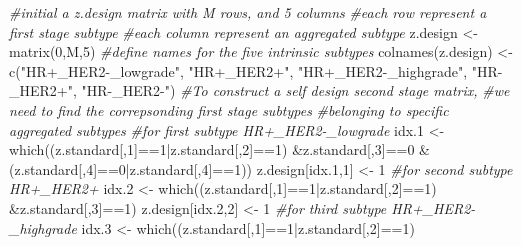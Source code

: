 \documentclass[11pt,]{article}
\newenvironment{Shaded}{\begin{snugshade}}{\end{snugshade}}
\newcommand{\CommentTok}[1]{\textcolor[rgb]{0.56,0.35,0.01}{\textit{#1}}}
\newcommand{\DecValTok}[1]{\textcolor[rgb]{0.00,0.00,0.81}{#1}}
\newcommand{\FloatTok}[1]{\textcolor[rgb]{0.00,0.00,0.81}{#1}}
\newcommand{\FunctionTok}[1]{\textcolor[rgb]{0.00,0.00,0.00}{#1}}
\newcommand{\NormalTok}[1]{#1}
\newcommand{\OtherTok}[1]{\textcolor[rgb]{0.56,0.35,0.01}{#1}}
\newcommand{\SpecialCharTok}[1]{\textcolor[rgb]{0.00,0.00,0.00}{#1}}
\newcommand{\StringTok}[1]{\textcolor[rgb]{0.31,0.60,0.02}{#1}}
\begin{document}
\begin{Shaded}
\begin{Highlighting}[]
\CommentTok{\#initial a z.design matrix with M rows, and 5 columns}
\CommentTok{\#each row represent a first stage subtype}
\CommentTok{\#each column represent an aggregated subtype}
\NormalTok{z.design }\OtherTok{\textless{}{-}} \FunctionTok{matrix}\NormalTok{(}\DecValTok{0}\NormalTok{,M,}\DecValTok{5}\NormalTok{)}
\CommentTok{\#define names for the five intrinsic subtypes}
\FunctionTok{colnames}\NormalTok{(z.design) }\OtherTok{\textless{}{-}} \FunctionTok{c}\NormalTok{(}\StringTok{"HR+\_HER2{-}\_lowgrade"}\NormalTok{,}
                        \StringTok{"HR+\_HER2+"}\NormalTok{,}
                        \StringTok{"HR+\_HER2{-}\_highgrade"}\NormalTok{,}
                        \StringTok{"HR{-}\_HER2+"}\NormalTok{, }
                        \StringTok{"HR{-}\_HER2{-}"}\NormalTok{)}
\CommentTok{\#To construct a self design second stage matrix,}
\CommentTok{\#we need to find the correpsonding first stage subtypes}
\CommentTok{\#belonging to specific aggregated subtypes}
\CommentTok{\#for first subtype HR+\_HER2{-}\_lowgrade}
\NormalTok{idx}\FloatTok{.1} \OtherTok{\textless{}{-}} \FunctionTok{which}\NormalTok{((z.standard[,}\DecValTok{1}\NormalTok{]}\SpecialCharTok{==}\DecValTok{1}\SpecialCharTok{|}\NormalTok{z.standard[,}\DecValTok{2}\NormalTok{]}\SpecialCharTok{==}\DecValTok{1}\NormalTok{)}
               \SpecialCharTok{\&}\NormalTok{z.standard[,}\DecValTok{3}\NormalTok{]}\SpecialCharTok{==}\DecValTok{0}
               \SpecialCharTok{\&}\NormalTok{(z.standard[,}\DecValTok{4}\NormalTok{]}\SpecialCharTok{==}\DecValTok{0}\SpecialCharTok{|}\NormalTok{z.standard[,}\DecValTok{4}\NormalTok{]}\SpecialCharTok{==}\DecValTok{1}\NormalTok{))}
\NormalTok{z.design[idx}\FloatTok{.1}\NormalTok{,}\DecValTok{1}\NormalTok{] }\OtherTok{\textless{}{-}} \DecValTok{1}
\CommentTok{\#for second subtype HR+\_HER2+}
\NormalTok{idx}\FloatTok{.2} \OtherTok{\textless{}{-}} \FunctionTok{which}\NormalTok{((z.standard[,}\DecValTok{1}\NormalTok{]}\SpecialCharTok{==}\DecValTok{1}\SpecialCharTok{|}\NormalTok{z.standard[,}\DecValTok{2}\NormalTok{]}\SpecialCharTok{==}\DecValTok{1}\NormalTok{)}
               \SpecialCharTok{\&}\NormalTok{z.standard[,}\DecValTok{3}\NormalTok{]}\SpecialCharTok{==}\DecValTok{1}\NormalTok{)}
\NormalTok{z.design[idx}\FloatTok{.2}\NormalTok{,}\DecValTok{2}\NormalTok{] }\OtherTok{\textless{}{-}} \DecValTok{1}
\CommentTok{\#for third subtype HR+\_HER2{-}\_highgrade}
\NormalTok{idx}\FloatTok{.3} \OtherTok{\textless{}{-}} \FunctionTok{which}\NormalTok{((z.standard[,}\DecValTok{1}\NormalTok{]}\SpecialCharTok{==}\DecValTok{1}\SpecialCharTok{|}\NormalTok{z.standard[,}\DecValTok{2}\NormalTok{]}\SpecialCharTok{==}\DecValTok{1}\NormalTok{)}

\end{Highlighting}
\end{Shaded}
\end{document}
